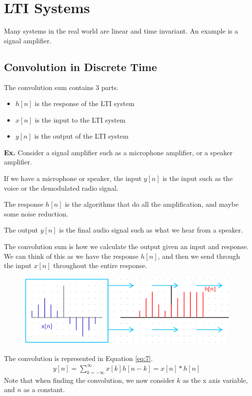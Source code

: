 \documentclass[12pt,letterpaper]{article} \usepackage{amsmath} \usepackage{graphicx} \usepackage[margin=1in]{geometry} \usepackage{longtable}  \usepackage{amssymb}
\begin{document}
	
	
	\section{LTI Systems}
	Many systems in the real world are linear and time invariant. An example is a signal amplifier. 
	
	\subsection{Convolution in Discrete Time}
	The convolution sum contains 3 parts. 
	\begin{itemize}
		\item $h[n]$ is the response of the LTI system
		\item $x[n]$ is the input to the LTI system
		\item $y[n]$ is the output of the LTI system
	\end{itemize}
	
	\begin{mdframed}
		\textbf{Ex.} Consider a signal amplifier such as a microphone amplifier, or a speaker amplifier. 
		
		If we have a microphone or speaker, the input $y[n]$ is the input such as the voice or the demodulated radio signal. 
		
		The response $h[n]$ is the algorithms that do all the amplification, and maybe some noise reduction. 
		
		The output $y[n]$ is the final audio signal such as what we hear from a speaker. 
	\end{mdframed}
	
	The convolution sum is how we calculate the output given an input and response. We can think of this as we have the response $h[n]$, and then we send through the input $x[n]$ throughout the entire response. 
	\begin{figure}
		\centering
		\includegraphics[width=0.7\linewidth]{"images/convolution idea"}
		\label{fig:convolution-idea}
	\end{figure}
	
	The convolution is represented in Equation \ref{eq:7}.
	\begin{align}
		y[n] = \sum^{\infty}_{k=-\infty} x[k]h[n-k] = x[n]*h[n] \label{eq:7}
	\end{align}
	Note that when finding the convolution, we now consider $k$ as the x axis variable, and $n$ as a constant. 
	
\end{document}
